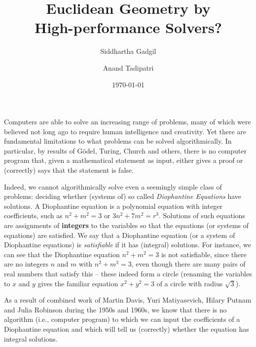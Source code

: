 \documentclass{amsart}
\theoremstyle{plain}
\theoremstyle{definition}
\theoremstyle{remark}
\begin{document}
\title[Euclidean Geometry by High-performance Solvers?]{Euclidean Geometry by\\ High-performance Solvers?}
\date{\today}
\author{Siddhartha Gadgil}

\address{Department of Mathematics\\
	Indian Institute of Science\\
	Bangalore.}

\author{Anand Tadipatri}
\address{Indian Institute of Science Education and Research\\
	Pune.}

\maketitle

Computers are able to solve an increasing range of problems, many of
which were believed not long ago to require human intelligence and creativity. Yet
there are fundamental limitations to what problems can be solved
algorithmically. In particular, by
results of G\"odel, Turing, Church and others, there is no computer
program that, given a mathematical statement as input, either gives a
proof or (correctly) says that the statement is false.

Indeed, we cannot algorithmically solve even a seemingly simple class of
problems: deciding whether (systems of) so called
\emph{Diophantine Equations} have solutions. A Diophantine equation is a polynomial
equation with integer coefficients, such as $n^2 + m^2 = 3$ or \(3n^2 + 7m^2 = r^3\).
Solutions of such equations are assignments of \textbf{integers} to the variables so that
the equations (or systems of equations) are satisfied.
We say that a Diophantine equation (or a system of Diophantine equations) is \emph{satisfiable}
if it has (integral) solutions.
For
instance, we can see that the Diophantine equation \(n^2 + m^2 = 3\) is not satisfiable,
since there are no integers $n$ and $m$ with \(n^2 + m^2 = 3\), even though there
are many pairs of real numbers that satisfy this -- these indeed form a circle (renaming the variables
to $x$ and $y$ gives the familiar equation $x^2+ y^2 =3$ of a circle with radius $\sqrt{3}$).

As a result of combined work of Martin Davis, Yuri Matiyasevich, Hilary
Putnam and Julia Robinson during the 1950s and 1960s, we know that there
is no algorithm (i.e., computer program) to which we can input the
coefficients of a Diophantine equation and which will tell us
(correctly) whether the equation has integral solutions.
\end{document}
